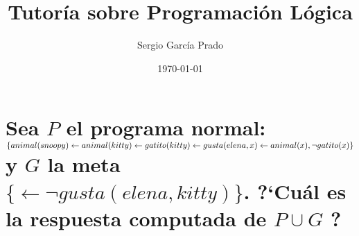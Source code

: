 \documentclass[11pt, a4paper,spanish]{article}
\title{\vspace{-15mm}\fontsize{24pt}{10pt}\selectfont\textbf{Tutoría sobre Programación Lógica}} %
\author{Sergio García Prado}
\date{\today}
\begin{document}
	\maketitle %

	\thispagestyle{fancy} %


	\section{Sea $P$ el programa normal: \\
		$\{ \\
		animal(snoopy) \gets \\
		animal(kitty) \gets \\
		gatito(kitty) \gets \\
		gusta(elena,x) \gets animal(x), \neg gatito(x) \\
		\}\\$
		y $G$ la meta $\{ \gets \neg gusta(elena,kitty) \}$. ?`Cuál es la respuesta computada de $P \cup {G}$ ?}

		\paragraph{}
\end{document}
